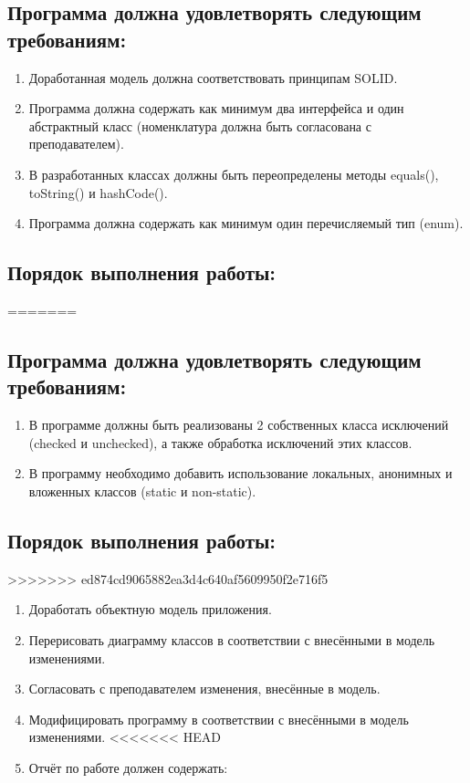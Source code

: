 \documentclass[11pt]{article}
\begin{document}
\subsection{Программа должна удовлетворять следующим требованиям:}
\label{sec:org4ba01f6}

\begin{enumerate}
\item Доработанная модель должна соответствовать принципам SOLID.
\item Программа должна содержать как минимум два интерфейса и один абстрактный класс (номенклатура должна быть согласована с преподавателем).
\item В разработанных классах должны быть переопределены методы equals(), toString() и hashCode().
\item Программа должна содержать как минимум один перечисляемый тип (enum).
\end{enumerate}

\subsection{Порядок выполнения работы:}
\label{sec:org1d22f3f}
=======
\label{sec:org51c8778}

\subsection{Программа должна удовлетворять следующим требованиям:}
\label{sec:orgfef1f85}
\begin{enumerate}
\item В программе должны быть реализованы 2 собственных класса исключений (checked и unchecked), а также обработка исключений этих классов.
\item В программу необходимо добавить использование локальных, анонимных и вложенных классов (static и non-static).
\end{enumerate}

\subsection{Порядок выполнения работы:}
\label{sec:org1d652d0}
>>>>>>> ed874cd9065882ea3d4c640af5609950f2e716f5

\begin{enumerate}
\item Доработать объектную модель приложения.
\item Перерисовать диаграмму классов в соответствии с внесёнными в модель изменениями.
\item Согласовать с преподавателем изменения, внесённые в модель.
\item Модифицировать программу в соответствии с внесёнными в модель изменениями.
<<<<<<< HEAD
\item Отчёт по работе должен содержать:
\end{enumerate}
\end{document}
